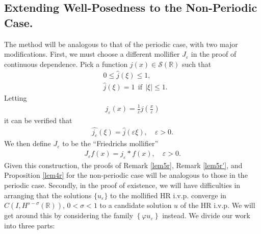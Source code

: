 \documentclass[12pt,reqno]{amsart}
\newcommand{\rr}{\mathbb{R}}
\newcommand{\ee}{\varepsilon}
\theoremstyle{plain}  %
\theoremstyle{definition}
\begin{document}
\begin{appendices}
\section{Extending Well-Posedness to the Non-Periodic Case.}
\label{sec:defs}
\setcounter{equation}{0}
\vskip0.1in
The method will be analogous to that of the periodic case, with two major
modifications. First, we must choose a different mollifier $J_\ee$ in the
proof of continuous dependence. Pick a
function $j(x) \in \mathcal{S}(\rr)$ such that
\begin{equation*}
		\begin{split}
			& 0 \le \widehat{j}(\xi) \le 1,
			\\
			& \widehat{j}(\xi) = 1 \ \ \text{if} \ \ |\xi| \le 1.
		\end{split}
	\end{equation*}
Letting
\begin{equation*}
	\begin{split}
		j_\ee(x) = \frac{1}{\ee} j \left (\frac{x}{\ee} \right )
	\end{split}
\end{equation*}
it can be verified that 
		\begin{equation*}
		\begin{split}
			\widehat{j_\ee}(\xi) = \widehat{j }(\ee \xi), \quad \ee > 0.
		\end{split}
	\end{equation*}
We then define $J_\ee$ to be the ``Friedrichs mollifier''
	\begin{equation*}
		\begin{split}
			J_\ee f(x) = j_\ee * f(x), \quad \ee>0.
		\end{split}
	\end{equation*}
Given this construction, the proofs of Remark \ref{lem5r}, Remark
\ref{lem5r'}, and Proposition \ref{lem4r} for the non-periodic case will be
analogous to those in the periodic case.
\vskip0.1in
Secondly, in the proof of existence, we will have difficulties in arranging
that the solutions $\{u_\ee\}$ to the mollified HR i.v.p. converge in $C(I,
H^{s- \sigma}(\rr))$, $0 < \sigma < 1$ to a candidate solution $u$ of the HR
i.v.p. We will get around this by considering the family $\left\{ \varphi
u_\ee \right\}$ instead.
%
%
\vskip0.1in
%
%
We divide our work into three parts:
\vskip0.1in

\end{appendices}
\end{document}
